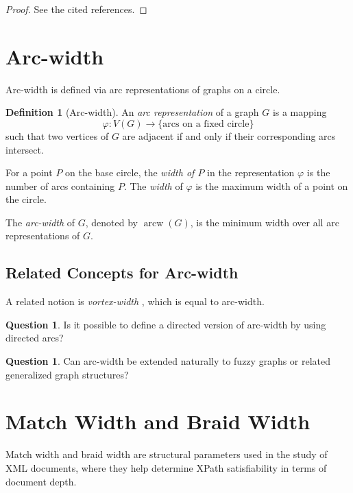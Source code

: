 \documentclass[10pt]{book}
\theoremstyle{definition}
\newtheorem{definition}[theorem]{Definition}
\newtheorem{question}[theorem]{Question}
\let\phi=\varphi
\begin{document}
\begin{proof}
See the cited references.
\end{proof}

\section{Arc-width}
Arc-width \cite{404,405} is defined via arc representations of graphs on a circle.

\begin{definition}[Arc-width]
\cite{404,405}
An \emph{arc representation} of a graph \(G\) is a mapping
\[
\phi:V(G)\to \{\text{arcs on a fixed circle}\}
\]
such that two vertices of \(G\) are adjacent if and only if their corresponding arcs intersect.

For a point \(P\) on the base circle, the \emph{width of \(P\)} in the representation \(\phi\) is the number of arcs containing \(P\).  
The \emph{width} of \(\phi\) is the maximum width of a point on the circle.

The \emph{arc-width} of \(G\), denoted by \(\operatorname{arcw}(G)\), is the minimum width over all arc representations of \(G\).
\end{definition}

\subsection{Related Concepts for Arc-width}

A related notion is \emph{vortex-width} \cite{406,407}, which is equal to arc-width.

\begin{question}
Is it possible to define a directed version of arc-width by using directed arcs?
\end{question}

\begin{question}
Can arc-width be extended naturally to fuzzy graphs or related generalized graph structures?
\end{question}

\section{Match Width and Braid Width}

Match width and braid width \cite{420} are structural parameters used in the study of XML documents, where they help determine XPath satisfiability in terms of document depth.
\end{document}
